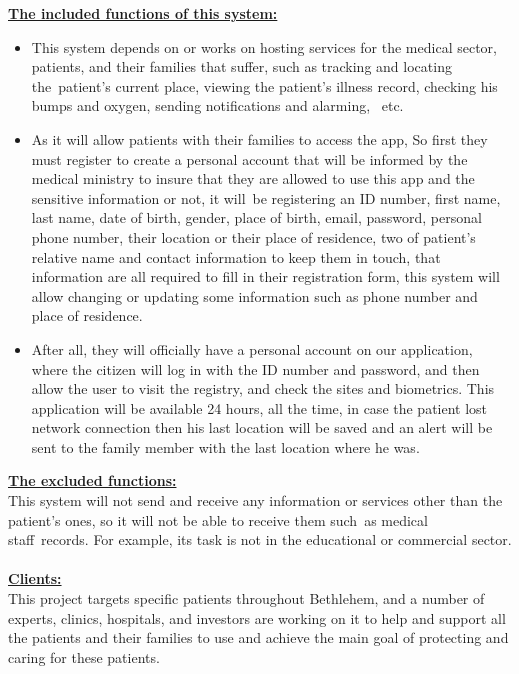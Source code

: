 \documentclass[12pt]{article}
\begin{document}
			
			\textbf{\underline{The included functions of this system: }}\\
			\begin{itemize}
				\item This system depends on or works on hosting services for the medical sector, patients, and their families that suffer, such as tracking and locating the patient's current place, viewing the patient’s illness record, checking his bumps and oxygen, sending notifications and alarming,  etc. 
				\item As it will allow patients with their families to access the app, So first they must register to create a personal account that will be informed by the medical ministry to insure that they are allowed to use this app and the sensitive information or not, it will be registering an ID number, first name, last name, date of birth, gender, place of birth, email, password, personal phone number, their location or their place of residence, two of patient’s relative name and contact information to keep them in touch, that information are all required to fill in their registration form, this system will allow changing or updating some information such as phone number and place of residence. 
				\item After all, they will officially have a personal account on our application, where the citizen will log in with the ID number and password, and then allow the user to visit the registry, and check the sites and biometrics. 
				This application will be available 24 hours, all the time, in case the patient lost network connection then his last location will be saved and an alert will be sent to the family member  with the last location where he was.
			\end{itemize}
		
			\begin{center}
			\end{center}
			\textbf{\underline{The excluded functions:}} \\

			This system will not send and receive any information or services other than the patient’s ones, so it will not be able to receive them such as medical staff records. For example, its task is not in the educational or commercial sector. \\
			\\
			\textbf{\underline{Clients:}}\\
			
			This project targets specific patients throughout Bethlehem, and a number of experts, clinics, hospitals, and investors are working on it to help and support all the patients and their families to use and achieve the main goal of protecting and caring for these patients. 
\end{document}
